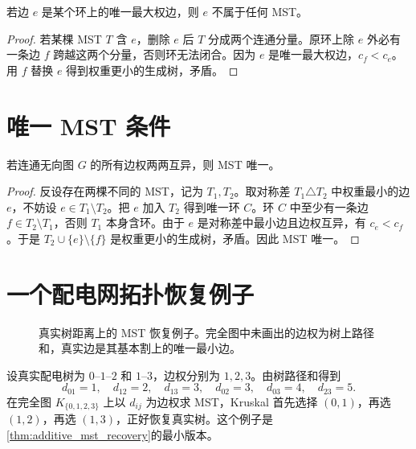 \begin{theorem}
\label{thm:cycle_property}
若边 $e$ 是某个环上的唯一最大权边，则 $e$ 不属于任何 MST。
\end{theorem}

\begin{proof}
若某棵 MST $T$ 含 $e$，删除 $e$ 后 $T$ 分成两个连通分量。原环上除 $e$ 外必有一条边 $f$ 跨越这两个分量，否则环无法闭合。因为 $e$ 是唯一最大权边，$c_f<c_e$。用 $f$ 替换 $e$ 得到权重更小的生成树，矛盾。
\end{proof}

\section{唯一 MST 条件}

\begin{theorem}
\label{thm:distinct_unique_mst}
若连通无向图 $G$ 的所有边权两两互异，则 MST 唯一。
\end{theorem}

\begin{proof}
反设存在两棵不同的 MST，记为 $T_1,T_2$。取对称差 $T_1\triangle T_2$ 中权重最小的边 $e$，不妨设 $e\in T_1\setminus T_2$。把 $e$ 加入 $T_2$ 得到唯一环 $C$。环 $C$ 中至少有一条边 $f\in T_2\setminus T_1$，否则 $T_1$ 本身含环。由于 $e$ 是对称差中最小边且边权互异，有 $c_e<c_f$。于是 $T_2\cup\{e\}\setminus\{f\}$ 是权重更小的生成树，矛盾。因此 MST 唯一。
\end{proof}

\section{一个配电网拓扑恢复例子}

\begin{figure}[htbp]
  \centering
  
  \caption{真实树距离上的 MST 恢复例子。完全图中未画出的边权为树上路径和，真实边是其基本割上的唯一最小边。}
  \label{fig:mst_example}
\end{figure}

\begin{example}[四节点馈线]
设真实配电树为 $0$--$1$--$2$ 和 $1$--$3$，边权分别为 $1,2,3$。由树路径和得到
\[
  d_{01}=1,\quad d_{12}=2,\quad d_{13}=3,\quad
  d_{02}=3,\quad d_{03}=4,\quad d_{23}=5.
\]
在完全图 $K_{\{0,1,2,3\}}$ 上以 $d_{ij}$ 为边权求 MST，Kruskal 首先选择 $(0,1)$，再选 $(1,2)$，再选 $(1,3)$，正好恢复真实树。这个例子是\cref{thm:additive_mst_recovery}的最小版本。
\end{example}

